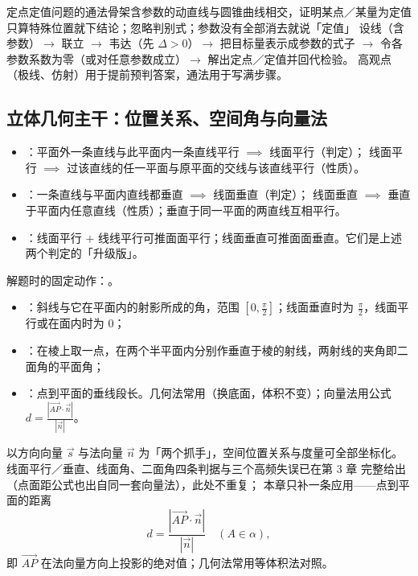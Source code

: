 \begin{explore}
\begin{conccard}[三级]{定点定值问题的通法骨架}{含参数的动直线与圆锥曲线相交，证明某点／某量为定值}{只算特殊位置就下结论；忽略判别式；参数没有全部消去就说「定值」}
设线（含参数）$\to$ 联立 $\to$ 韦达（先 $\Delta>0$）$\to$ 把目标量表示成参数的式子 $\to$ 令各参数系数为零（或对任意参数成立）$\to$ 解出定点／定值并回代检验。
高观点（极线、仿射）用于提前预判答案，通法用于写满步骤。
\end{conccard}

\subsection{立体几何主干：位置关系、空间角与向量法}


\begin{itemize}
  \item {}：平面外一条直线与此平面内一条直线平行 $\implies$ 线面平行（判定）；
        线面平行 $\implies$ 过该直线的任一平面与原平面的交线与该直线平行（性质）。
  \item {}：一条直线与平面内直线都垂直 $\implies$ 线面垂直（判定）；
        线面垂直 $\implies$ 垂直于平面内任意直线（性质）；垂直于同一平面的两直线互相平行。
  \item {}：线面平行 $+$ 线线平行可推面面平行；线面垂直可推面面垂直。它们是上述两个判定的「升级版」。
\end{itemize}
解题时的固定动作：。

\begin{itemize}
  \item {}：斜线与它在平面内的射影所成的角，范围 $\left[0,\frac\pi2\right]$；线面垂直时为 $\frac\pi2$，线面平行或在面内时为 $0$；
  \item {}：在棱上取一点，在两个半平面内分别作垂直于棱的射线，两射线的夹角即二面角的平面角；
  \item {}：点到平面的垂线段长。几何法常用（换底面，体积不变）；向量法用公式 $d=\frac{|\overrightarrow{AP}\cdot\vec n|}{|\vec n|}$。
\end{itemize}

以方向向量 $\vec s$ 与法向量 $\vec n$ 为「两个抓手」，空间位置关系与度量可全部坐标化。
线面平行／垂直、线面角、二面角四条判据与三个高频失误已在第 3 章
完整给出（点面距公式也出自同一套向量法），此处不重复；
本章只补一条应用——点到平面的距离
\[
  d=\frac{|\overrightarrow{AP}\cdot\vec n|}{|\vec n|}\quad(A\in\alpha),
\]
即 $\overrightarrow{AP}$ 在法向量方向上投影的绝对值；几何法常用等体积法对照。


\end{explore}
